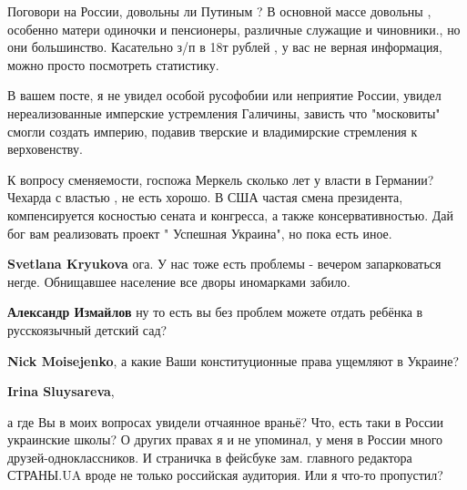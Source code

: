 \begin{itemize}
\begin{itemize}
Поговори на России, довольны ли Путиным ? В основной массе довольны , особенно
матери одиночки и пенсионеры, различные служащие и чиновники., но они
большинство. Касательно з/п в 18т рублей , у вас не верная информация, можно
просто посмотреть статистику. 

В вашем посте, я не увидел особой русофобии или неприятие России, увидел
нереализованные имперские устремления Галичины, зависть что "московиты" смогли
создать империю, подавив тверские и владимирские стремления к верховенству. 

К вопросу сменяемости, госпожа Меркель сколько лет у власти в Германии? Чехарда
с властью , не есть хорошо. В США частая смена президента, компенсируется
косностью сената и конгресса, а также консервативностью. Дай бог вам
реализовать проект " Успешная Украина", но пока есть иное.
 
 
\textbf{Svetlana Kryukova} ога. У нас тоже есть проблемы - вечером запарковаться негде. Обнищавшее население все дворы иномарками забило.

 
\textbf{Александр Измайлов} ну то есть вы без проблем можете отдать ребёнка в русскоязычный детский сад?

 
\textbf{Nick Moisejenko}, а какие Ваши конституционные права ущемляют в Украине?

 
\textbf{Irina Sluysareva}, 

а где Вы в моих вопросах увидели отчаянное враньё? Что, есть таки в России
украинские школы? О других правах я и не упоминал, у меня в России много
друзей-одноклассников. И страничка в фейсбуке зам. главного редактора СТРАНЫ.UA
вроде не только российская аудитория. Или я что-то пропустил?



\end{itemize}
\end{itemize}
